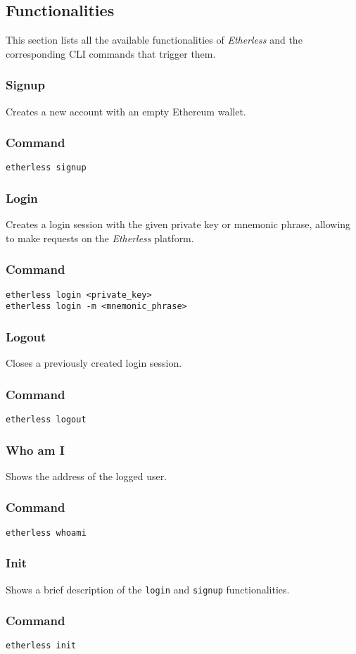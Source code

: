 \subsection{Functionalities}
	This section lists all the available functionalities of \textit{Etherless} and the corresponding CLI commands that trigger them.
	\subsubsection{Signup}
	Creates a new account with an empty Ethereum wallet.
	\subsubsection*{Command}
	\texttt{etherless signup}
	\subsubsection{Login}
	Creates a login session with the given private key or mnemonic phrase, allowing to make requests on the \textit{Etherless} platform.
	\subsubsection*{Command}
	\texttt{etherless login <private\_key>} \\
	\texttt{etherless login -m <mnemonic\_phrase>}
	\subsubsection{Logout}
	Closes a previously created login session.
	\subsubsection*{Command}
	\texttt{etherless logout}
	\subsubsection{Who am I}
	Shows the address of the logged user.
	\subsubsection*{Command}
	\texttt{etherless whoami}
	\subsubsection{Init}
	Shows a brief description of the \texttt{login} and \texttt{signup} functionalities.
	\subsubsection*{Command}
	\texttt{etherless init}
